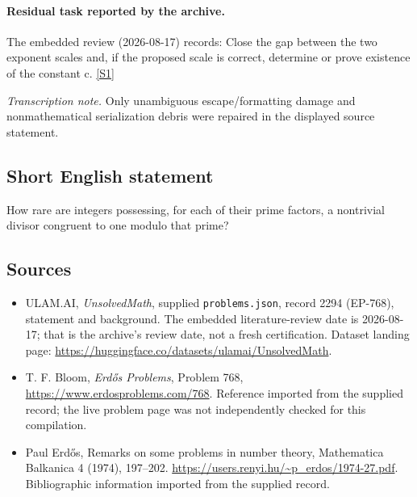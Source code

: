 \documentclass[11pt,a4paper]{article}
\newcommand{\sref}[2]{\hyperlink{source:#1:#2}{[S#2]}}
\begin{document}
\paragraph{Residual task reported by the archive.}

The embedded review (2026-08-17) records: Close the gap between the two exponent scales and, if the proposed scale is correct, determine or prove existence of the constant c. \sref{2294}{1}

{\small\emph{Transcription note.} Only unambiguous escape/formatting damage and nonmathematical serialization debris were repaired in the displayed source statement.}

\subsection{Short English statement}

How rare are integers possessing, for each of their prime factors, a nontrivial divisor congruent to one modulo that prime?

\subsection{Sources}

{\small

\begin{itemize}

\item[\hypertarget{source:2294:1}{S1}] ULAM.AI, \emph{UnsolvedMath}, supplied \texttt{problems.json}, record 2294 (EP-768), statement and background. The embedded literature-review date is 2026-08-17; that is the archive’s review date, not a fresh certification. Dataset landing page: \url{https://huggingface.co/datasets/ulamai/UnsolvedMath}.

\item[\hypertarget{source:2294:2}{S2}] T. F. Bloom, \emph{Erdős Problems}, Problem 768, \url{https://www.erdosproblems.com/768}. Reference imported from the supplied record; the live problem page was not independently checked for this compilation.

\item[\hypertarget{source:2294:3}{S3}] Paul Erdős, Remarks on some problems in number theory, Mathematica Balkanica 4 (1974), 197--202. \url{https://users.renyi.hu/~p_erdos/1974-27.pdf}. Bibliographic information imported from the supplied record.

\end{itemize}

}

\label{end:2294}
\end{document}
